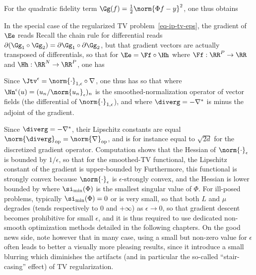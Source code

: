 For the quadratic fidelity term $\Gg(f)=\frac{1}{2}\norm{\Phi f-y}^2$, one thus obtains

In the special case of the regularized TV problem~\eqref{eq-ip-tv-eps}, the gradient of $\Ee$ reads
Recall the chain rule for differential reads $\partial (\Gg_1 \circ \Gg_2) = \partial \Gg_1 \circ \partial \Gg_2$, but that gradient vectors are actually transposed of differentials, so that for $\Ee = \Ff \circ \Hh$ where $\Ff : \RR^P \rightarrow \RR$ and $\Hh : \RR^N \rightarrow \RR^P$, one has

Since $\Jtv^\epsilon = \norm{\cdot}_{1,\epsilon} \circ \nabla$, one thus has
so that 
where $\Nn^\epsilon(u) = ( u_n/\norm{u_n}_\epsilon )_n$ is the smoothed-normalization operator of vector fields (the differential of $\norm{\cdot}_{1,\epsilon}$), and where $\diverg=-\nabla^*$ is minus the adjoint of the gradient.

Since $\diverg=-\nabla^*$, their Lipschitz constants are equal $\norm{\diverg}_\text{op}=\norm{\nabla}_\text{op}$, and is for instance equal to $\sqrt{2d}$ for the discretized gradient operator. 
%
Computation shows that the Hessian of $\norm{\cdot}_\epsilon$ is bounded by $1/\epsilon$, so that for the smoothed-TV functional, the Lipschitz constant of the gradient is upper-bounded by
Furthermore, this functional is strongly convex because $\norm{\cdot}_\epsilon$ is $\epsilon$-strongly convex, and the Hessian is lower bounded by
where $\si_{\min}( \Phi )$ is the smallest singular value of $\Phi$. For ill-posed problems, typically $\si_{\min}( \Phi )=0$ or is very small, so that both $L$ and $\mu$ degrades (tends respectively to $0$ and $+\infty$) as $\epsilon \rightarrow 0$, so that gradient descent becomes prohibitive for small $\epsilon$, and it is thus required to use dedicated non-smooth optimization methods detailed in the following chapters. 
%
On the good news side, note however that in many case, using a small but non-zero value for $\epsilon$ often leads to better a visually more pleasing results, since it introduce a small blurring which diminishes the artifacts (and in particular the so-called ``stair-casing'' effect) of TV regularization. 



